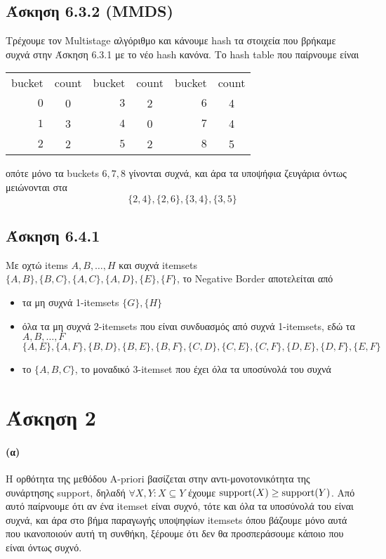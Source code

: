 \documentclass[a4paper,11pt]{article}
\begin{document}
\subsection*{Άσκηση 6.3.2 (MMDS)}
Τρέχουμε τον Multistage αλγόριθμο και κάνουμε hash τα στοιχεία που βρήκαμε συχνά στην Άσκηση 6.3.1 με το νέο hash κανόνα.
Το hash table που παίρνουμε είναι
\begin{center}
	\begin{tabular}{| r | c || r | c || r | c |}
		\hline
		bucket & count & bucket & count & bucket & count \\ \hhline{|=|=#=|=#=|=|}
		$0$ & 0 & $3$ & 2 & $6$ & 4 \\ \hline
		$1$ & 3 & $4$ & 0 & $7$ & 4 \\ \hline
		$2$ & 2 & $5$ & 2 & $8$ & 5 \\ \hline
	\end{tabular}
\end{center}
οπότε μόνο τα buckets $6,7,8$ γίνονται συχνά, και άρα τα υποψήφια ζευγάρια όντως μειώνονται στα
\[\{2,4\},\{2,6\},\{3,4\},\{3,5\}\]


\subsection*{Άσκηση 6.4.1}

Με οχτώ items $A,B,\dots,H$ και συχνά itemsets $\{A,B\},\{B,C\},\{A,C\},\{A,D\},\{E\},\{F\}$, το Negative Border αποτελείται από
\begin{itemize}
	\item τα μη συχνά 1-itemsets $\{G\},\{H\}$
	\item όλα τα μη συχνά 2-itemsets που είναι συνδυασμός από συχνά 1-itemsets, εδώ τα $A,B,\dots,F$
		\[
			\{A,E\},\{A,F\},\{B,D\},\{B,E\},\{B,F\},\{C,D\},\{C,E\},\{C,F\},\{D,E\},\{D,F\},\{E,F\}
		\]
	\item το $\{A,B,C\}$, το μοναδικό 3-itemset που έχει όλα τα υποσύνολά του συχνά
\end{itemize}

\section*{Άσκηση 2}

\paragraph{(α)} Η ορθότητα της μεθόδου A-priori βασίζεται στην αντι-μονοτονικότητα της συνάρτησης support, δηλαδή $\forall X,Y: X \subseteq Y$ έχουμε $\textnormal{support}(X) \geq \textnormal{support}(Y)$.
Από αυτό παίρνουμε ότι αν ένα itemset είναι συχνό, τότε και όλα τα υποσύνολά του είναι συχνά, και άρα στο βήμα παραγωγής υποψηφίων itemsets όπου βάζουμε μόνο αυτά που ικανοποιούν αυτή τη συνθήκη, ξέρουμε ότι δεν θα προσπεράσουμε κάποιο που είναι όντως συχνό.
\end{document}
